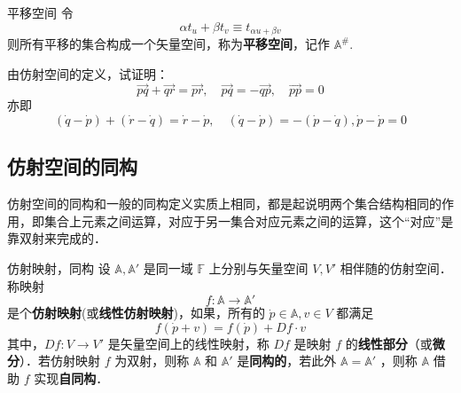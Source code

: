 \begin{definition}{平移空间}
令
\begin{equation}
\alpha t_u+\beta t_v\equiv t_{\alpha u+\beta v}
\end{equation}
则所有平移的集合构成一个矢量空间，称为\textbf{平移空间}，记作 $\mathbb A^{\#}$.
\end{definition}
\begin{example}{}
由仿射空间的定义，试证明：
\begin{equation}\label{AfSp_eq1}
\vec{pq}+\vec{qr}=\vec{pr},\quad \vec{pq}=-\vec{qp},\quad\vec{pp}=0
\end{equation}
亦即
\begin{equation}
(\dot q-\dot p )+(\dot r-\dot q)=\dot r-\dot p,\quad(\dot q-\dot p)=-(\dot p-\dot q),\dot p-\dot p=0
\end{equation}

\end{example}
\subsection{仿射空间的同构}
仿射空间的同构和一般的同构定义实质上相同，都是起说明两个集合结构相同的作用，即集合上元素之间运算，对应于另一集合对应元素之间的运算，这个“对应”是靠双射来完成的．
\begin{definition}{仿射映射，同构}
设 $\mathbb A,\mathbb A'$ 是同一域 $\mathbb F$ 上分别与矢量空间 $V,V'$ 相伴随的仿射空间．称映射 
\begin{equation}
f:\mathbb A\rightarrow\mathbb A' 
\end{equation}
是个\textbf{仿射映射}(或\textbf{线性仿射映射})，如果，所有的 $\dot p\in \mathbb A,v\in V$ 都满足
\begin{equation}
f(\dot p+v)=f(\dot p)+Df\cdot v
\end{equation}
 其中，$Df:V\rightarrow V'$ 是矢量空间上的线性映射，称 $Df$ 是映射 $f$ 的\textbf{线性部分}（或\textbf{微分}）．若仿射映射 $f$ 为双射，则称 $\mathbb A$ 和 $\mathbb A'$ 是\textbf{同构的}，若此外 $\mathbb A=\mathbb A'$ ，则称 $\mathbb A$ 借助 $f$ 实现\textbf{自同构}．
\end{definition}

